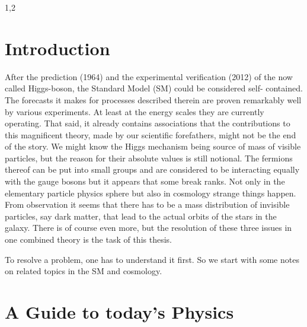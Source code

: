 \documentclass[11pt,a4paper,twoside]{article}
\numberwithin{equation}{section}
\begin{document}
\begin{spacing}{1,2}

\thispagestyle{empty}
 \cleardoublepage

\setcounter{page}{1}
\pagestyle{fancy}

\section{Introduction}
After the prediction (1964) and the experimental verification (2012) of the
now called Higgs-boson, the Standard Model (SM) could be considered self-
contained. The forecasts it makes for processes described therein are proven
remarkably well by various experiments. At least at the energy scales they
are currently operating. That said, it already contains associations that the
contributions to this magnificent theory, made by our scientific forefathers, might not be
the end of the story. We might know the Higgs mechanism being source of mass of visible particles,
but the reason for their absolute values is still notional. The fermions thereof can be put into
small groups and are considered to be interacting equally with the gauge bosons but it appears
that some break ranks. Not only in the elementary particle physics sphere but also in cosmology
strange things happen. From observation it seems that there has to be a mass distribution of
invisible particles, say dark matter, that lead to the actual orbits of the stars in the galaxy.
There is of course even more, but the resolution of these three issues in one combined theory is
the task of this thesis.

\noindent To resolve a problem, one has to understand it first. So we start with some notes on 
related topics in the SM and cosmology.




\section{A Guide to today's Physics}


\end{spacing}
\end{document}
